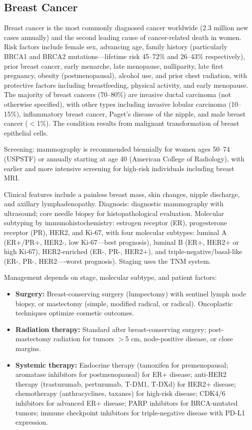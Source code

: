 \subsection{Breast Cancer}
\label{sec:Breast Cancer}
Breast cancer is the most commonly diagnosed cancer worldwide (2.3 million new cases annually) and the second leading cause of cancer-related death in women. Risk factors include female sex, advancing age, family history (particularly BRCA1 and BRCA2 mutations---lifetime risk 45--72\% and 26--43\% respectively), prior breast cancer, early menarche, late menopause, nulliparity, late first pregnancy, obesity (postmenopausal), alcohol use, and prior chest radiation, with protective factors including breastfeeding, physical activity, and early menopause. The majority of breast cancers (70--80\%) are invasive ductal carcinoma (not otherwise specified), with other types including invasive lobular carcinoma (10--15\%), inflammatory breast cancer, Paget's disease of the nipple, and male breast cancer ($<$1\%). The condition results from malignant transformation of breast epithelial cells.

Screening: mammography is recommended biennially for women ages 50--74 (USPSTF) or annually starting at age 40 (American College of Radiology), with earlier and more intensive screening for high-risk individuals including breast MRI.

Clinical features include a painless breast mass, skin changes, nipple discharge, and axillary lymphadenopathy. Diagnosis: diagnostic mammography with ultrasound; core needle biopsy for histopathological evaluation. Molecular subtyping by immunohistochemistry: estrogen receptor (ER), progesterone receptor (PR), HER2, and Ki-67, with four molecular subtypes: luminal A (ER+/PR+, HER2-, low Ki-67---best prognosis), luminal B (ER+, HER2+ or high Ki-67), HER2-enriched (ER-, PR-, HER2+), and triple-negative/basal-like (ER-, PR-, HER2----worst prognosis). Staging uses the TNM system.

Management depends on stage, molecular subtype, and patient factors:
\begin{itemize}[noitemsep]
  \item \textbf{Surgery:} Breast-conserving surgery (lumpectomy) with sentinel lymph node biopsy, or mastectomy (simple, modified radical, or radical). Oncoplastic techniques optimize cosmetic outcomes.
  \item \textbf{Radiation therapy:} Standard after breast-conserving surgery; post-mastectomy radiation for tumors $>$5 cm, node-positive disease, or close margins.
  \item \textbf{Systemic therapy:} Endocrine therapy (tamoxifen for premenopausal; aromatase inhibitors for postmenopausal) for ER+ disease; anti-HER2 therapy (trastuzumab, pertuzumab, T-DM1, T-DXd) for HER2+ disease; chemotherapy (anthracyclines, taxanes) for high-risk disease; CDK4/6 inhibitors for advanced ER+ disease; PARP inhibitors for BRCA-mutated tumors; immune checkpoint inhibitors for triple-negative disease with PD-L1 expression.
\end{itemize}

